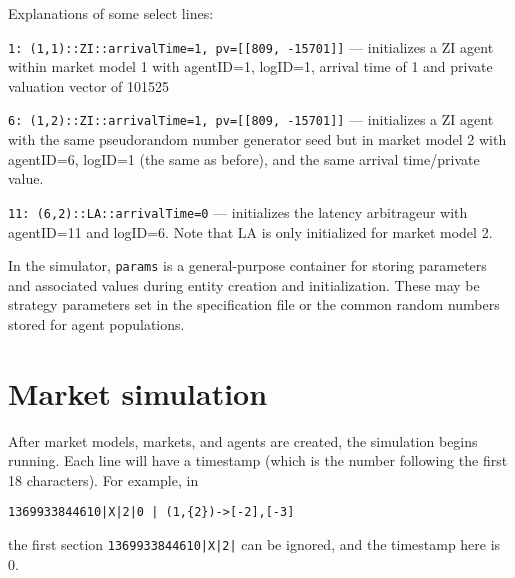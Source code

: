 \documentclass[11pt]{article}
\begin{document}
Explanations of some select lines:
\begin{description}
\item \texttt{1: (1,{1})::ZI::arrivalTime=1, pv=[[809, -15701]]} --- initializes a ZI agent within market model 1 with agentID=1, logID=1, arrival time of 1 and private valuation vector of 101525

\item \texttt{6: (1,{2})::ZI::arrivalTime=1, pv=[[809, -15701]]} --- initializes a ZI agent with the same pseudorandom number generator seed but in market model 2 with agentID=6, logID=1 (the same as before), and the same arrival time/private value.

\item \texttt{11: (6,{2})::LA::arrivalTime=0} --- initializes the latency arbitrageur with agentID=11 and logID=6. Note that LA is only initialized for market model 2.
\end{description}

In the simulator, \texttt{params} is a general-purpose container for storing parameters and associated values during entity creation and initialization. These may be strategy parameters set in the specification file or the common random numbers stored for agent populations.


\section{Market simulation}

After market models, markets, and agents are created, the simulation begins running.
Each line will have a timestamp (which is the number following the first 18 characters).
For example, in 
\begin{verbatim}
1369933844610|X|2|0 | (1,{2})->[-2],[-3]
\end{verbatim}
the first section \texttt{1369933844610|X|2|} can be ignored, and the timestamp here is 0.
\end{document}
